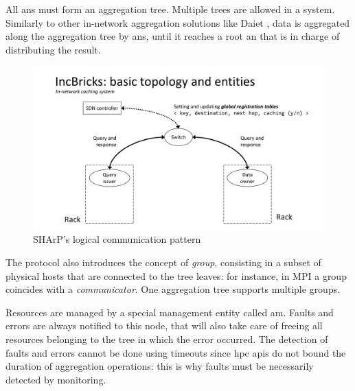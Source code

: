 All \glspl{an} must form an aggregation tree.
Multiple trees are allowed in a system.
Similarly to other in-network aggregation solutions like Daiet \cite{daiet}, data is aggregated along the aggregation tree by \glspl{an}, until it reaches a root \gls{an} that is in charge of distributing the result.

\begin{figure}[!htb]
    \centering
        \includegraphics[page=15, clip, trim=3.3cm 0.9cm 1.6cm 4.6cm, width=1.00\textwidth]{figures/analysis/inp/presentation.pdf}
    \caption{SHArP's \texorpdfstring{\cite{sharp}}{} logical communication pattern}
\end{figure}

The protocol also introduces the concept of \textit{group}, consisting in a subset of physical hosts that are connected to the tree leaves: for instance, in MPI \cite{mpi} a group coincides with a \textit{communicator}.
One aggregation tree supports multiple groups.

Resources are managed by a special management entity called \gls{am}.
Faults and errors are always notified to this node, that will also take care of freeing all resources belonging to the tree in which the error occurred.
The detection of faults and errors cannot be done using timeouts since \gls{hpc} \glspl{api} do not bound the duration of aggregation operations: this is why faults must be necessarily detected by monitoring.

